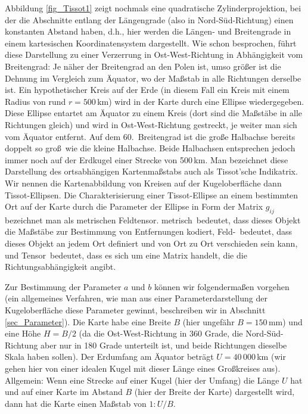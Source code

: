 Abbildung \ref{fig_Tissot1} zeigt nochmals eine quadratische Zylinderprojektion, bei der die
Abschnitte entlang der L\"angengrade (also in Nord-S\"ud-Richtung)
einen konstanten Abstand haben, d.h., hier werden
die L\"angen- und Breitengrade in einem kartesischen Koordinatensystem dargestellt. 
Wie schon besprochen, f\"uhrt diese Darstellung zu einer Verzerrung in Ost-West-Richtung
in Abh\"angigkeit vom Breitengrad: Je n\"aher der Breitengrad an den Polen ist, umso
gr\"o\ss er ist die Dehnung im Vergleich zum \"Aquator, wo der Ma\ss stab in alle Richtungen
derselbe ist. Ein hypothetischer Kreis auf der Erde (in diesem Fall ein Kreis mit einem 
Radius von rund $r=500$\,km) wird in der Karte durch eine Ellipse wiedergegeben. Diese
Ellipse entartet am \"Aquator zu einem Kreis (dort sind die Ma\ss st\"abe in alle
Richtungen gleich) und wird in Ost-West-Richtung gestreckt, je weiter man sich vom 
\"Aquator entfernt. Auf dem 60.\ Breitengrad ist die gro\ss e Halbachse bereits doppelt so gro\ss\
wie die kleine Halbachse. Beide Halbachsen entsprechen jedoch immer noch auf der
Erdkugel einer Strecke von 500\,km. Man bezeichnet diese Darstellung des ortsabh\"angigen
Kartenma\ss stabs auch als Tissot'sche Indikatrix. Wir nennen die Kartenabbildung von Kreisen auf der
Kugeloberfl\"ache dann Tissot-Ellipsen.\index{Tissot-Ellipse} 
Die Charakterisierung einer Tissot-Ellipse an einem
bestimmten Ort auf der Karte durch die Parameter der Ellipse in Form der Matrix $g_{ij}$
bezeichnet man als metrischen Feldtensor.\index{Feldtensor, metrischer} 
\glqq metrisch\grqq\ bedeutet, dass dieses
Objekt die Ma\ss st\"abe zur Bestimmung von Entfernungen kodiert, \glqq Feld-\grqq\ bedeutet,
dass dieses Objekt an jedem Ort definiert und von Ort zu Ort verschieden sein kann, und 
\glqq Tensor\grqq\ bedeutet, dass es sich um eine Matrix handelt, die die Richtungsabh\"angigkeit
angibt. 

Zur Bestimmung der Parameter $a$ und $b$ k\"onnen wir folgenderma\ss en vorgehen (ein
allgemeines Verfahren, wie man aus einer Parameterdarstellung der Kugeloberfl\"ache diese
Parameter gewinnt, beschreiben wir
in Abschnitt \ref{sec_Parameter}). Die Karte habe eine Breite $B$ (hier ungef\"ahr $B=150$\,mm)
und eine H\"ohe $H=B/2$ (da die Ost-West-Richtung in 360 Grade, die Nord-S\"ud-Richtung
aber nur in 180 Grade unterteilt ist, und beide Richtungen dieselbe Skala haben sollen). 
Der Erdumfang am \"Aquator betr\"agt $U=40\,000$\,km 
(wir gehen hier von einer idealen Kugel mit dieser L\"ange eines Gro\ss kreises aus).
Allgemein: Wenn eine Strecke auf einer Kugel (hier der Umfang) die L\"ange $U$ hat und auf einer Karte 
im Abstand $B$ (hier der Breite der Karte) dargestellt wird, 
dann hat die Karte einen Ma\ss stab von $1:U/B$. 

